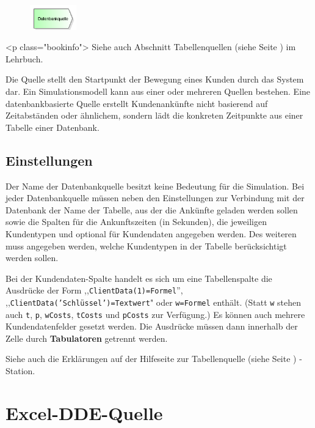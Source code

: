 \begin{figure}
\vspace{-22pt}
\includegraphics[width=2cm]{imageModelElementSourceDB.png}
\vspace{-22pt}
\end{figure}

<p class="bookinfo">
Siehe auch Abschnitt Tabellenquellen (siehe Seite \pageref{ref:book:9.3.1}) im Lehrbuch.

Die Quelle stellt den Startpunkt der Bewegung eines Kunden durch das System dar.
Ein Simulationsmodell kann aus einer oder mehreren Quellen bestehen.
Eine datenbankbasierte Quelle erstellt Kundenankünfte nicht basierend auf
Zeitabständen oder ähnlichem, sondern lädt die konkreten Zeitpunkte aus einer
Tabelle einer Datenbank.

\subsection*{Einstellungen}

Der Name der Datenbankquelle besitzt keine Bedeutung für die Simulation.
Bei jeder Datenbankquelle müssen neben den Einstellungen zur Verbindung mit
der Datenbank der Name der Tabelle, aus der die Ankünfte geladen werden sollen
sowie die Spalten für die Ankunftszeiten (in Sekunden), die jeweiligen Kundentypen
und optional für Kundendaten angegeben werden. Des weiteren muss angegeben werden,
welche Kundentypen in der Tabelle berücksichtigt werden sollen.

Bei der Kundendaten-Spalte handelt es sich um eine Tabellenspalte die Ausdrücke
der Form ,,\texttt{ClientData(1)=Formel}'', ,,\texttt{ClientData('Schlüssel')=Textwert}"
oder \texttt{w=Formel} enthält. (Statt \texttt{w} stehen auch \texttt{t}, \texttt{p},
\texttt{wCosts}, \texttt{tCosts} und \texttt{pCosts} zur Verfügung.)
Es können auch mehrere Kundendatenfelder gesetzt werden.
Die Ausdrücke müssen dann innerhalb der Zelle durch \textbf{Tabulatoren} getrennt werden.

Siehe auch die Erklärungen auf der Hilfeseite zur Tabellenquelle (siehe Seite \pageref{ref:ModelElementSourceTable}) -Station.


\section{Excel-DDE-Quelle}
\label{ref:ModelElementSourceDDE}

